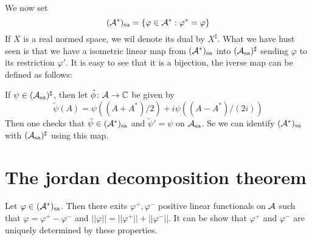 \documentclass[10pt,english,a4paper]{article}
\theoremstyle{definition}
\def\Assa{\As_{\text{sa}}}
\def\sa{\text{sa}}
\def\vphi{\varphi}
\begin{document}
We now set 
\[  (\As^*)_{\text{sa}} = \{ \vphi \in \As^* : \vphi^* = \vphi \}\]
If $X$ is a real normed space, we wil denote its dual by $X^{\sharp}$.
What we have hust seen is that we have a isometric linear map from 
$(\mathcal{A}^*)_{\text{sa}}$ into $(\Assa)^{\sharp}$ sending $\vphi$ to its restriction
$\vphi'$. It is easy to see that it is a bijection,
the iverse map can be defined as follows: 

If $\psi \in (\Assa)^{\sharp}$, then let $\tilde{\phi} \colon \mathcal{A} \to \mathbb{C}$ be 
given by 
\[ \tilde{\psi}(A) = \psi((A+A^*)/2) + i\psi((A-A^*)/(2i))  \]
Then one checks that $\tilde{\psi} \in (\mathcal{A}^*)_{\text{sa}}$ and
$\tilde{\psi}'=\psi$ on $\Assa$. Se we can identify 
$(\mathcal{A}^*)_{\text{sa}}$ with $(\Assa)^{\sharp}$ using this map. 

\section{The jordan decomposition theorem}
Let $\vphi \in (\As^*)_{\sa}$. Then there exits $\vphi^+,\vphi^-$
positive linear functionals on $\mathcal{A}$ such that 
$\vphi = \vphi^+ - \vphi^-$ and 
$||\vphi|| = ||\vphi^+|| + ||\vphi^-||$.
It can be show that $\vphi^+$ and $\vphi^-$ are uniquely determined by these
properties. 
\end{document}
